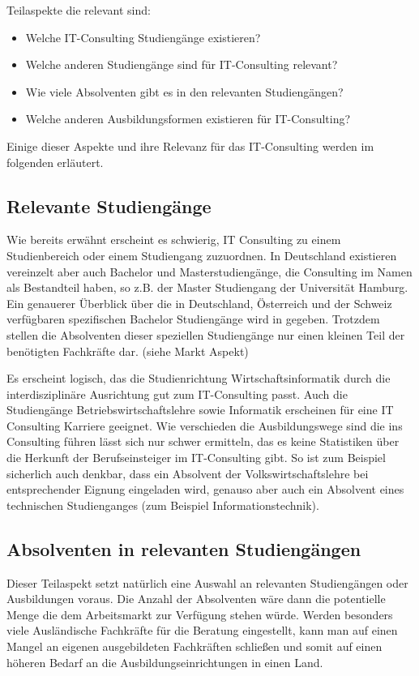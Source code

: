 Teilaspekte die relevant sind:
\begin{itemize} 
\item Welche IT-Consulting Studiengänge existieren?
\item Welche anderen Studiengänge sind für IT-Consulting relevant?
\item Wie viele Absolventen gibt es in den relevanten Studiengängen?
\item Welche anderen Ausbildungsformen existieren für IT-Consulting?
\end{itemize}

Einige dieser Aspekte und ihre Relevanz für das IT-Consulting werden im folgenden erläutert.

\subsection{Relevante Studiengänge}
Wie bereits erwähnt erscheint es schwierig, IT Consulting zu einem Studienbereich oder einem Studiengang zuzuordnen. 
In Deutschland existieren vereinzelt aber auch Bachelor und Masterstudiengänge, die Consulting im Namen als Bestandteil haben, so z.B. der Master Studiengang der Universität Hamburg. Ein genauerer Überblick über die in Deutschland, Österreich und der Schweiz verfügbaren spezifischen Bachelor Studiengänge wird in \cite{NissenKlaukDeelmannMohe201209} gegeben. Trotzdem stellen die Absolventen dieser speziellen Studiengänge nur einen kleinen Teil der benötigten Fachkräfte dar. (siehe Markt Aspekt)

Es erscheint logisch, das die Studienrichtung Wirtschaftsinformatik durch die interdisziplinäre Ausrichtung gut zum IT-Consulting passt. Auch die Studiengänge Betriebswirtschaftslehre sowie Informatik erscheinen für eine IT Consulting Karriere geeignet. Wie verschieden die Ausbildungswege sind die ins Consulting führen lässt sich nur schwer ermitteln, das es keine Statistiken über die Herkunft der Berufseinsteiger im IT-Consulting gibt.
So ist zum Beispiel sicherlich auch denkbar, dass ein Absolvent der Volkswirtschaftslehre bei entsprechender Eignung eingeladen wird, genauso aber auch ein Absolvent eines technischen Studienganges (zum Beispiel Informationstechnik).

\subsection{Absolventen in relevanten Studiengängen}
Dieser Teilaspekt setzt natürlich eine Auswahl an relevanten Studiengängen oder Ausbildungen voraus. Die Anzahl der Absolventen wäre dann die potentielle Menge die dem Arbeitsmarkt zur Verfügung stehen würde. Werden besonders viele Ausländische Fachkräfte für die Beratung eingestellt, kann man auf einen Mangel an eigenen ausgebildeten Fachkräften schließen und somit auf einen höheren Bedarf an die Ausbildungseinrichtungen in einen Land.

